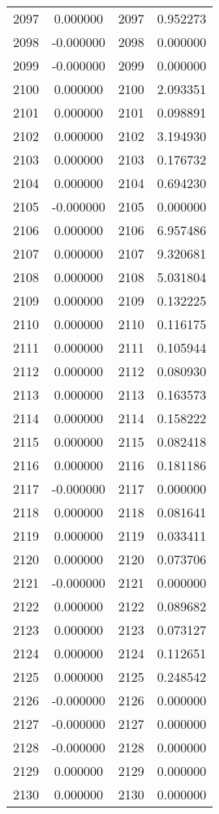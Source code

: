 \documentclass[12pt]{article}
\begin{document}
\begin{longtable}{@{}cccc@{}}
2097 & 0.000000 & 2097 & 0.952273 \\
2098 & -0.000000 & 2098 & 0.000000 \\
2099 & -0.000000 & 2099 & 0.000000 \\
2100 & 0.000000 & 2100 & 2.093351 \\
2101 & 0.000000 & 2101 & 0.098891 \\
2102 & 0.000000 & 2102 & 3.194930 \\
2103 & 0.000000 & 2103 & 0.176732 \\
2104 & 0.000000 & 2104 & 0.694230 \\
2105 & -0.000000 & 2105 & 0.000000 \\
2106 & 0.000000 & 2106 & 6.957486 \\
2107 & 0.000000 & 2107 & 9.320681 \\
2108 & 0.000000 & 2108 & 5.031804 \\
2109 & 0.000000 & 2109 & 0.132225 \\
2110 & 0.000000 & 2110 & 0.116175 \\
2111 & 0.000000 & 2111 & 0.105944 \\
2112 & 0.000000 & 2112 & 0.080930 \\
2113 & 0.000000 & 2113 & 0.163573 \\
2114 & 0.000000 & 2114 & 0.158222 \\
2115 & 0.000000 & 2115 & 0.082418 \\
2116 & 0.000000 & 2116 & 0.181186 \\
2117 & -0.000000 & 2117 & 0.000000 \\
2118 & 0.000000 & 2118 & 0.081641 \\
2119 & 0.000000 & 2119 & 0.033411 \\
2120 & 0.000000 & 2120 & 0.073706 \\
2121 & -0.000000 & 2121 & 0.000000 \\
2122 & 0.000000 & 2122 & 0.089682 \\
2123 & 0.000000 & 2123 & 0.073127 \\
2124 & 0.000000 & 2124 & 0.112651 \\
2125 & 0.000000 & 2125 & 0.248542 \\
2126 & -0.000000 & 2126 & 0.000000 \\
2127 & -0.000000 & 2127 & 0.000000 \\
2128 & -0.000000 & 2128 & 0.000000 \\
2129 & 0.000000 & 2129 & 0.000000 \\
2130 & 0.000000 & 2130 & 0.000000 \\

\end{longtable}
\end{document}
